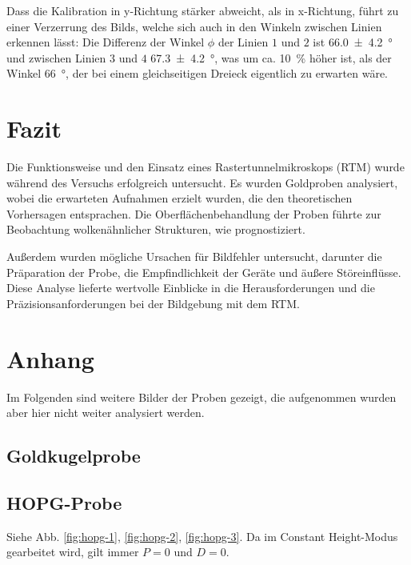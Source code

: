 \documentclass{article}
\newcommand{\defc}{black}
\newcommand{\colorT}[2][blue]{\color{#1}{#2}\color{\defc}}
\newcommand{\todo}[1]{\colorT[red]{\textbf{(#1)}}}
\begin{document}
Dass die Kalibration in y-Richtung stärker abweicht, als in x-Richtung,
führt zu einer Verzerrung des Bilds, welche sich auch in den Winkeln zwischen Linien erkennen lässt: Die Differenz der
Winkel $\phi$ der Linien $1$ und $2$ ist \SI{66.0\pm 4.2}{\degree} und zwischen Linien $3$ und $4$ \SI{67.3\pm 4.2}{\degree},
was um ca. \SI{10}{\percent} höher ist, als der Winkel \SI{66}{\degree}, der bei einem gleichseitigen Dreieck eigentlich zu
erwarten wäre.


\clearpage
\section{Fazit}
Die Funktionsweise und den Einsatz eines Rastertunnelmikroskops (RTM) wurde während des Versuchs erfolgreich untersucht. Es wurden Goldproben analysiert, wobei die erwarteten Aufnahmen erzielt wurden, die den theoretischen Vorhersagen entsprachen. Die Oberflächenbehandlung der Proben führte zur Beobachtung wolkenähnlicher Strukturen, wie prognostiziert. 

Außerdem wurden mögliche Ursachen für Bildfehler untersucht, darunter die Präparation der Probe, die Empfindlichkeit der Geräte und äußere Störeinflüsse. Diese Analyse lieferte wertvolle Einblicke in die Herausforderungen und die Präzisionsanforderungen bei der Bildgebung mit dem RTM.







\clearpage
\section{Anhang}
Im Folgenden sind weitere Bilder der Proben gezeigt, die aufgenommen wurden aber hier nicht weiter analysiert werden.

\subsection{Goldkugelprobe}
\todo{todo}

\subsection{HOPG-Probe}
Siehe Abb. \ref{fig:hopg-1}, \ref{fig:hopg-2}, \ref{fig:hopg-3}. Da im Constant Height-Modus gearbeitet wird, gilt immer $P=0$ und $D=0$.
\end{document}
